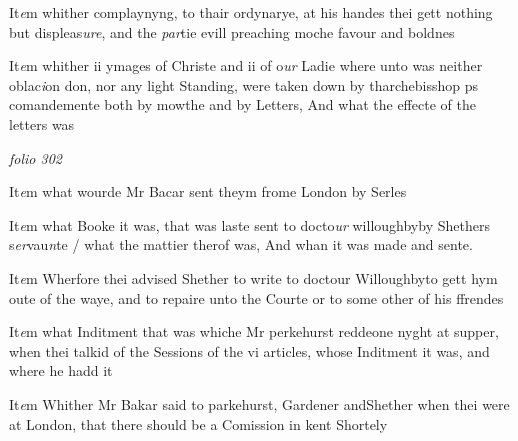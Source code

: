 \documentclass[12pt, a4paper]{book}
\begin{document}
				\marginpar[\vspace{0.5cm}{\textcolor{Gray}{11}}]{}
			

		\ifthenelse{\isodd{\thepage}}
		{\reversemarginpar}
		{\normalmarginpar}
		 It\textit{e}m whither complaynyng, to thair ordynarye, at his handes
thei gett nothing but displeas\textit{ure}, and the \textit{par}tie evill preaching
moche favour and boldnes
            		
				\marginpar[\vspace{0.5cm}{\textcolor{Gray}{12}}]{}
			
 
		\ifthenelse{\isodd{\thepage}}
		{\reversemarginpar}
		{\normalmarginpar}
		It\textit{e}m whither ii ymages of Christe and ii of o\textit{ur} Ladie where unto
was neither oblac\textit{i}on don, nor any light Standing, were taken
down by tharchebisshop ps comandemente both by mowthe and by
Letters, And what the effecte of the letters was

\dotfill
						\newpage
{}

\textit{folio 302}




		\ifthenelse{\isodd{\thepage}}
		{\reversemarginpar}
		{\normalmarginpar}
		It\textit{e}m what wourde Mr Bacar sent theym frome London by Serles



		\ifthenelse{\isodd{\thepage}}
		{\reversemarginpar}
		{\normalmarginpar}
		It\textit{e}m what Booke it was, that was laste sent to docto\textit{ur }willoughbyby Shethers s\textit{er}vau\textit{n}te / what the mattier therof was, And whan it 
was made and sente. 




		\ifthenelse{\isodd{\thepage}}
		{\reversemarginpar}
		{\normalmarginpar}
		It\textit{e}m Wherfore thei advised Shether to write to doctour Willoughbyto gett hym oute of the waye, and to repaire unto the Courte
or to some other of his ffrendes




		\ifthenelse{\isodd{\thepage}}
		{\reversemarginpar}
		{\normalmarginpar}
		It\textit{e}m what Inditment that was whiche Mr perkehurst reddeone nyght at supper, when thei talkid of the Sessions of the 
vi articles, whose Inditment it was, and where he hadd it




		\ifthenelse{\isodd{\thepage}}
		{\reversemarginpar}
		{\normalmarginpar}
		It\textit{e}m Whither Mr Bakar said to parkehurst, Gardener andShether when thei were at London, that there should be
a Comission in kent Shortely
\end{document}
